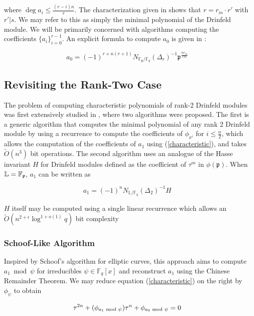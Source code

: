 \documentclass[sigconf]{acmart}
\newcommand{\F}{\mathbb{F}}
\renewcommand{\L}{\mathbb{L}}
\newcommand{\frakp}{\mathfrak{p}}
\begin{document}
where $\deg a_i \leq \frac{(r - i)n}{r}$. The characterization given in \cite{assong2020explicit} shows that $r = r_m \cdot r'$ with $ r' | s$. We may refer to this as simply the minimal polynomial of the Drinfeld module. We will be primarily concerned with algorithms computing the coefficients $\{ a_i \}_{i=0}^{r-1}$. An explicit formula to compute $a_0$ is given in \cite{GaPa18}:

\begin{equation}\label{norm}
    a_0 = (-1)^{r + n(r+1)}N_{\F_{\mathfrak{p}}/\F_q}(\Delta_r)^{-1} \mathfrak{p}^{ \frac{n r_m}{ r m}}
\end{equation}

\subsection{Revisiting the Rank-Two Case}

The problem of computing characteristic polynomials of rank-2 Drinfeld modules was first extensively studied in \cite{gekeler}, where two algorithms were proposed. The first is a generic algorithm that computes the minimal polynomial of any rank 2 Drinfeld module by using a recurrence to compute the coefficients of $\phi_{x^i}$ for $i \leq \frac{n}{2}$, which allows the computation of the coefficients of $a_1$ using (\ref{characteristic}), and takes $\tilde{O}(n^3)$ bit operations. The second algorithm uses an analogue of the Hasse invariant $H$ for Drinfeld modules defined as the coefficient of $\tau^m$ in $\phi(\frakp)$. When $\L = \F_{\frak{p}}$, $a_1$ can be written as

\begin{equation*}
    a_1 = (-1)^n N_{\L/\F_q}(\Delta_2)^{-1}H
\end{equation*}

$H$ itself may be computed using a single linear recurrence which allows an $\tilde{O}(n^{2 + \epsilon} \log^{1 + o(1)} q)$ bit complexity

\subsubsection{Schoof-Like Algorithm} Inspired by Schoof's algorithm for elliptic curves, this approach aims to compute $a_1 \bmod \psi$ for irreducibles $\psi \in \F_q[x]$ and reconstruct $a_1$ using the Chinese Remainder Theorem. We may reduce equation (\ref{characteristic}) on the right by $\phi_{\psi}$ to obtain

\begin{equation*}
    \tau^{2n} + (\phi_{a_1 \textnormal{ mod } \psi}) \tau^n + \phi_{a_0 \textnormal{ mod } \psi} = 0
\end{equation*}
\end{document}
